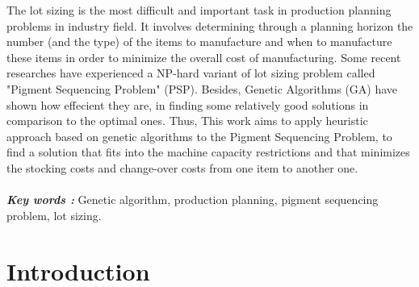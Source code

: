 \documentclass[12pt,a4paper]{article}
\begin{document}
	The lot sizing is the most difficult and important task in production planning problems in industry field. It involves determining through a planning horizon the number (and the type) of the items to manufacture and when to manufacture these items in order to minimize the overall cost of manufacturing. Some recent researches have experienced a NP-hard variant of lot sizing problem called "Pigment Sequencing Problem" (PSP). Besides, Genetic Algorithms (GA) have shown how effecient they are, in finding some relatively good solutions in comparison to the optimal ones. Thus, This work aims to apply heuristic approach based on genetic algorithms to the Pigment Sequencing Problem, to find a solution that fits into the machine capacity restrictions and that minimizes the stocking costs and change-over costs from one item to another one.\\
	\\
	\hspace*{.5cm}\textsl{\textbf{Key words :}} Genetic algorithm, production planning, pigment sequencing problem, lot sizing.
	
	  
	
	\newpage
	
	\part*{Introduction}
	
\end{document}
